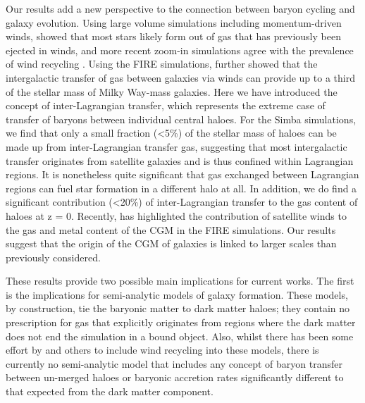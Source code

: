 \documentclass[fleqn,usenatbib]{mnras}
\newcommand{\simba}{{\sc Simba}}
\begin{document}
Our results add a new perspective to the connection between baryon cycling
and galaxy evolution. Using large volume simulations including
momentum-driven winds, \citet{Oppenheimer2010} showed that most stars likely
form out of gas that has previously been ejected in winds, and more recent
zoom-in simulations agree with the prevalence of wind recycling
\citep{Christensen2016, AnglesAlcazar2017, Tollet2019}. Using the FIRE
simulations, \citet{AnglesAlcazar2017} further showed that the intergalactic
transfer of gas between galaxies via winds can provide up to a third of the
stellar mass of Milky Way-mass galaxies. Here we have introduced the concept
of inter-Lagrangian transfer, which represents the extreme case of transfer
of baryons between individual central haloes. For the \simba{} simulations,
we find that only a small fraction (<5\%) of the stellar mass of haloes can
be made up from inter-Lagrangian transfer gas, suggesting that most
intergalactic transfer originates from satellite galaxies and is thus
confined within Lagrangian regions. It is nonetheless quite significant that
gas exchanged between Lagrangian regions can fuel star formation in a
different halo at all. In addition, we do find a significant contribution
(<20\%) of inter-Lagrangian transfer to the gas content of haloes at z = 0.
Recently, \citet{Hafen2019} has highlighted the contribution of satellite
winds to the gas and metal content of the CGM in the FIRE simulations. Our
results suggest that the origin of the CGM of galaxies is linked to larger
scales than previously considered.

These results provide two possible main implications for current works. The
first is the implications for semi-analytic models of galaxy formation. These
models, by construction, tie the baryonic matter to dark matter haloes; they
contain no prescription for gas that explicitly originates from regions where
the dark matter does not end the simulation in a bound object. Also, whilst
there has been some effort by \citet{Henriques2015, White2015} and others to
include wind recycling into these models, there is currently no semi-analytic
model that includes any concept of baryon transfer between un-merged haloes
or baryonic accretion rates significantly different to that expected from the
dark matter component.
\end{document}
